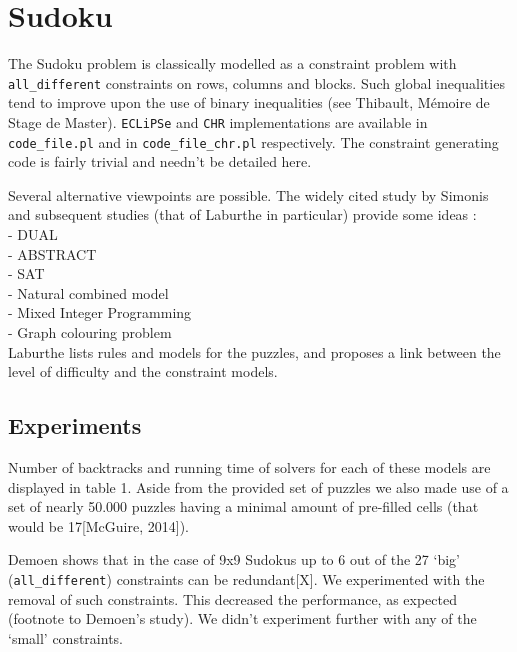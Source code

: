 \section{Sudoku}

The Sudoku problem is classically modelled as a constraint problem with \texttt{all\_different} constraints on rows, columns and blocks. Such global inequalities tend to improve upon the use of binary inequalities (see Thibault, M\'emoire de Stage de Master). \texttt{ECLiPSe} and \texttt{CHR} implementations are available in \texttt{code\_file.pl} and in \texttt{code\_file\_chr.pl} respectively. The constraint generating code is fairly trivial and needn't be detailed here. \\\par

Several alternative viewpoints are possible. The widely cited study by Simonis and subsequent studies (that of Laburthe in particular) provide some ideas :\\
 - DUAL\\
 - ABSTRACT\\
 - SAT\\
 - Natural combined model\\
 - Mixed Integer Programming\\
 - Graph colouring problem\\
Laburthe lists rules and models for the puzzles, and proposes a link between the level of difficulty and the constraint models. \\\par

\subsection{Experiments}

Number of backtracks and running time of solvers for each of these models are displayed in table 1. Aside from the provided set of puzzles we also made use of a set of nearly 50.000 puzzles having a minimal amount of pre-filled cells (that would be 17[McGuire, 2014]). \\\par

Demoen shows that in the case of 9x9 Sudokus up to 6 out of the 27 `big' (\texttt{all\_different}) constraints can be redundant[X]. We experimented with the removal of such constraints. This decreased the performance, as expected (footnote to Demoen's study). We didn't experiment further with any of the `small' constraints.

